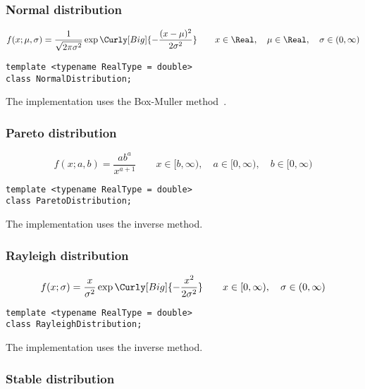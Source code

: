 \subsubsection{Normal distribution}

\begin{equation*}
  f(x;\mu,\sigma) =
  \frac{1}{\sqrt{2\pi\sigma^2}}
  \exp\Curly[Big]{-\frac{(x-\mu)^2}{2\sigma^2}} \qquad
  x \in \Real,\quad \mu \in \Real,\quad \sigma \in (0, \infty)
\end{equation*}
\begin{Verbatim}
template <typename RealType = double>
class NormalDistribution;
\end{Verbatim}
The implementation uses the Box-Muller method~\cite{Box:1958hv}.

\subsubsection{Pareto distribution}

\begin{equation*}
  f(x;a,b) = \frac{a b^a}{x^{a + 1}} \qquad
  x \in [b, \infty),\quad a \in [0, \infty),\quad b \in [0, \infty)
\end{equation*}
\begin{Verbatim}
template <typename RealType = double>
class ParetoDistribution;
\end{Verbatim}
The implementation uses the inverse method.

\subsubsection{Rayleigh distribution}

\begin{equation*}
  f(x;\sigma) =
  \frac{x}{\sigma^2}\exp\Curly[Big]{-\frac{x^2}{2\sigma^2}} \qquad
  x \in [0, \infty),\quad \sigma \in (0, \infty)
\end{equation*}
\begin{Verbatim}
template <typename RealType = double>
class RayleighDistribution;
\end{Verbatim}
The implementation uses the inverse method.

\subsubsection{Stable distribution}

